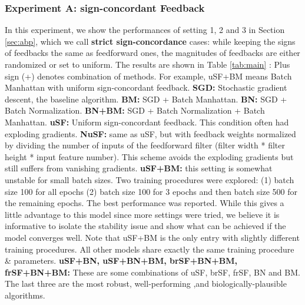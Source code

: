 \documentclass[letterpaper]{article}
\begin{document}
\subsubsection{Experiment A: sign-concordant Feedback} 

In this experiment, we show the performances of setting 1, 2 and 3 in Section \ref{sec:abp}, which we call \textbf{strict sign-concordance} cases: while keeping the signs of feedbacks the same as feedforward ones, the magnitudes of feedbacks are either randomized or set to uniform. The results are shown in Table \ref{tab:main} : Plus sign (+) denotes combination of methods. For example, uSF+BM means Batch Manhattan with uniform sign-concordant feedback. \textbf{SGD:} Stochastic gradient descent, the baseline algorithm. \textbf{BM:} SGD + Batch Manhattan. \textbf{BN:} SGD + Batch Normalization. \textbf{BN+BM:} SGD + Batch Normalization + Batch Manhattan. \textbf{uSF:} Uniform sign-concordant feedback. This condition often had exploding gradients.  \textbf{NuSF:} same as uSF, but with feedback weights normalized by dividing the number of inputs of the feedforward filter (filter width * filter height * input feature number). This scheme avoids the exploding gradients but still suffers from vanishing gradients. \textbf{uSF+BM:} this setting is somewhat unstable for small batch sizes. Two training procedures were explored: (1) batch size 100 for all epochs (2) batch size 100 for 3 epochs and then batch size 500 for the remaining epochs. The best performance was reported. While this gives a little advantage to this model since more settings were tried, we believe it is informative to isolate the stability issue and show what can be achieved if the model converges well. Note that uSF+BM is the only entry with slightly different training procedures. All other models share exactly the same training procedure \& parameters. \textbf{uSF+BN, uSF+BN+BM,  brSF+BN+BM, frSF+BN+BM:} These are some combinations of uSF, brSF, frSF, BN and BM. The last three are the most robust, well-performing ,and biologically-plausible algorithms. \\
\end{document}
